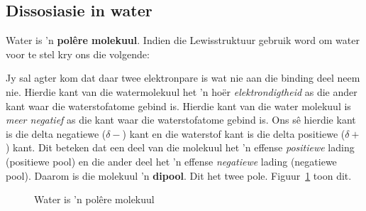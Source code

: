             \subsection*{Dissosiasie in water}
            \nopagebreak
        \label{m38720*id335324}Water is 'n \textbf{pol\^{e}re molekuul}. Indien die Lewisstruktuur gebruik word om water voor te stel kry ons die volgende:
\begin{figure}[H]
\begin{center}
\end{center}
\end{figure}
Jy sal agter kom dat daar twee elektronpare is wat nie aan die binding deel neem nie. Hierdie kant van die watermolekuul het 'n ho\"{e}r \textsl{elektrondigtheid} as die ander kant waar die waterstofatome gebind is. Hierdie kant van die water molekuul is \textsl{meer negatief} as die kant waar die waterstofatome gebind is. Ons s\^{e} hierdie kant is die delta negatiewe ($\delta -$) kant en die waterstof kant is die delta positiewe ($\delta +$) kant. Dit beteken dat een deel van die molekuul het 'n effense \textsl{positiewe} lading (positiewe pool) en die ander deel het 'n effense \textsl{negatiewe} lading (negatiewe pool). Daarom is die molekuul 'n \textbf{dipool}. Dit het twee pole. Figuur~\ref{fig:hydrosphere:water} toon dit.\par 
    \setcounter{subfigure}{0}
\begin{figure}[H]
\begin{center}
\end{center}
\caption{Water is 'n pol\^{e}re molekuul}
\label{fig:hydrosphere:water}
\end{figure}

